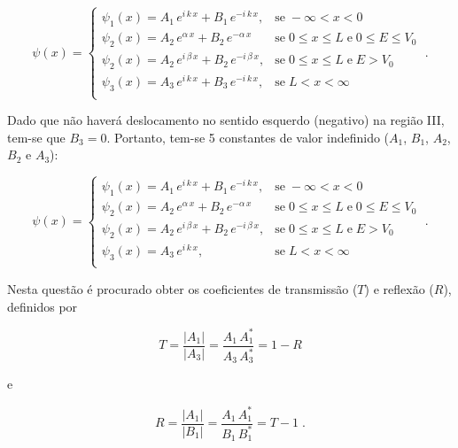 \begin{equation}
	\psi(x) =
	\begin{cases}
		\psi_{1}(x) = A_1\,e^{i\,k\,x} + B_1\,e^{-i\,k\,x},         &
		\mbox{se}\; -\infty<x<0                                       \\
		\psi_{2}(x) = A_2\,e^{\alpha\,x} + B_2\,e^{-\alpha\,x}      &
		\mbox{se}\; 0 \le x \le L \;\mbox{e}\;0 \le E \le V_0         \\
		\psi_{2}(x) = A_2\,e^{i\,\beta\,x} + B_2\,e^{-i\,\beta\,x}, &
		\mbox{se}\; 0 \le x \le L \;\mbox{e}\; E > V_0                \\
		\psi_{3}(x) = A_3\,e^{i\,k\,x} + B_3\,e^{-i\,k\,x},         &
		\mbox{se}\; L<x<\infty                                        \\
	\end{cases}\;.
\end{equation}

\noindent Dado que não haverá deslocamento no sentido esquerdo (negativo) na
região III, tem-se que $B_3 = 0$. Portanto, tem-se 5 constantes de valor
indefinido ($A_1$, $B_1$, $A_2$, $B_2$ e $A_3$):

\begin{equation}
	\psi(x) =
	\begin{cases}
		\psi_{1}(x) = A_1\,e^{i\,k\,x} + B_1\,e^{-i\,k\,x},         &
		\mbox{se}\; -\infty<x<0                                       \\
		\psi_{2}(x) = A_2\,e^{\alpha\,x} + B_2\,e^{-\alpha\,x}      &
		\mbox{se}\; 0 \le x \le L \;\mbox{e}\;0 \le E \le V_0         \\
		\psi_{2}(x) = A_2\,e^{i\,\beta\,x} + B_2\,e^{-i\,\beta\,x}, &
		\mbox{se}\; 0 \le x \le L \;\mbox{e}\; E > V_0                \\
		\psi_{3}(x) = A_3\,e^{i\,k\,x},                             &
		\mbox{se}\; L<x<\infty                                        \\
	\end{cases}\;.
\end{equation}

Nesta questão é procurado obter os coeficientes de transmissão ($T$)
e reflexão ($R$), definidos por

\begin{equation}
	T = \frac{|A_1|}{|A_3|} = \frac{A_1\,A_1^{*}}{A_3\,A_3^{*}} = 1-R
\end{equation}

\noindent e

\begin{equation}
	R = \frac{|A_1|}{|B_1|} = \frac{A_1\,A_1^{*}}{B_1\,B_1^{*}} = T-1\;.
\end{equation}

